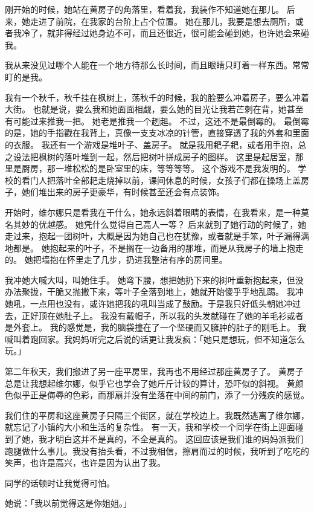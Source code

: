 \documentclass[UTF8]{ctexart}
\begin{document}
刚开始的时候，她站在黄房子的角落里，看着我，我装作不知道她在那儿。
后来，她走进了前院，在我家的台阶上占个位置。
她在那儿，我要是想去厕所，或者我冷了，就非得经过她身边不可，而且还很近，很可能会碰到她，也许她会来碰我。

我从来没见过哪个人能在一个地方待那么长时间，而且眼睛只盯着一样东西。常常盯的是我。

我有一个秋千，秋千挂在枫树上，荡秋千的时候，我的脸要么冲着房子，要么冲着大街。
也就是说，要么我和她面面相觑，要么她的目光让我若芒刺在背，她甚至有可能过来推我一把。
她老是推我一个趔趄。
不过，这还不是最倒霉的。
最倒霉的是，她的手指戳在我背上，真像一支支冰凉的针管，直接穿透了我的外套和里面的衣服。
我还有一个游戏是堆叶子、盖房子。
就是我用耙子耙，或者用手抱，总之设法把枫树的落叶堆到一起，然后把树叶拼成房子的图样。
这里是起居室，那里是厨房，那一堆松松的是卧室里的床，等等等等。
这个游戏不是我发明的。
学校的看门人把落叶全部耙走烧掉以前，课间休息的时候，女孩子们都在操场上盖房子，她们堆出来的房子更豪华，有时候甚至还会有点装饰。

开始时，维尔娜只是看我在干什么，她永远斜着眼睛的表情，在我看来，是一种莫名其妙的优越感。
她凭什么觉得自己高人一等？
后来就到了她行动的时候了，她走过来，抱起一团树叶，大概是因为她自己也在犹豫，或者就是手笨，叶子漏得满地都是。
她抱起来的叶子，不是搁在一边备用的那堆，而是从我房子的墙上抱走的。
她把墙抱在怀里走了几步，扔进我整洁有序的房间里。

我冲她大喊大叫，叫她住手。
她弯下腰，想把她扔下来的树叶重新抱起来，但没办法聚拢，干脆又抛撒下来，等叶子全落到地上，她就开始傻乎乎地乱踢。
我冲她吼，一点用也没有，或许她把我的吼叫当成了鼓励。于是我只好低头朝她冲过去，正好顶在她肚子上。
我没有戴帽子，所以我的头发就碰在了她的羊毛衫或者是外套上。
我的感觉是，我的脑袋撞在了一个坚硬而又臃肿的肚子的刚毛上。
我喊叫着跑回家。我妈妈听完之后说的话更让我发疯：「她只是想玩，但不知道怎么玩。」

第二年秋天，我们搬进了另一座平房里，我再也不用经过那座黄房子了。
黄房子总是让我想起维尔娜，似乎它也学会了她斤斤计较的算计，恐吓似的斜视。
黄颜色似乎正是侮辱的色彩，而那扇并没有坐落在中间的前门，添了一分残疾的感觉。

我们住的平房和这座黄房子只隔三个街区，就在学校边上。我既然逃离了维尔娜，就忘记了小镇的大小和生活的复杂性。
有一天，我和学校一个同学在街上迎面碰到了她，我才明白这并不是真的，不全是真的。
这回应该是我们谁的妈妈派我们跑腿做什么事儿。我没有抬头看，不过我相信，擦肩而过的时候，我听到了吃吃的笑声，也许是高兴，也许是因为认出了我。

同学的话顿时让我觉得可怕。

她说：「我以前觉得这是你姐姐。」
\end{document}
